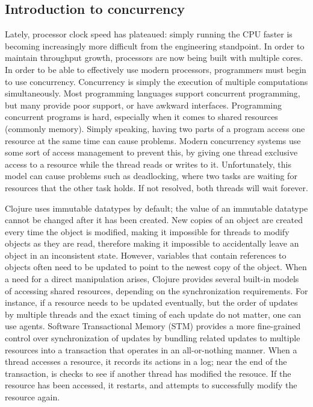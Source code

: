 \documentclass[12pt]{article}
\newcommand{\comment}[1]{{\bf \tt  {#1}}}
\newcommand{\emcomment}[1]{\textcolor{ForestGreen}{\comment{Elena: {#1}}}}
\begin{document}
\subsection{Introduction to concurrency}\label{sec:concurrency}
 Lately, processor clock speed has plateaued: simply running the CPU faster is becoming increasingly more difficult from the engineering standpoint. 
In order to maintain throughput growth, processors are now being built with multiple cores. In order to be able to effectively use modern processors, programmers must begin to use concurrency. Concurrency is simply the execution of multiple computations simultaneously. Most programming languages support concurrent programming, but many provide poor support, or have awkward interfaces. 
Programming concurrent programs is hard, especially when it comes to shared resources (commonly memory). Simply speaking, having two parts of a program access one resource at the same time can cause problems. Modern concurrency systems use some sort of access management to prevent this, by giving one thread exclusive access to a resource while the thread reads or writes to it. Unfortunately, this model can cause problems such as deadlocking, where two tasks are waiting for resources that the other task holds. If not resolved, both threads will wait forever. 

Clojure uses immutable datatypes by default; the value of an immutable datatype cannot be changed after it has been created. New copies of an object are created every time the object is modified, making it impossible for threads to modify objects as they are read, therefore making it impossible to accidentally leave an object in an inconsistent state. 
However, variables that contain references to objects often need to be updated to point to the newest copy of the object. When a need for a direct manipulation arises, 
Clojure provides several built-in models of accessing shared resources, depending on the synchronization requirements. For instance, if a resource needs to be updated eventually, but the order of updates by multiple threads and the exact timing of each update do not matter, one can use agents. Software Transactional Memory (STM) provides a more fine-grained control over synchronization of updates by bundling related updates to multiple resources into a transaction that operates in an all-or-nothing manner. When a thread accesses a resource, it records its actions in a log; near the end of the transaction, is checks to see if another thread has modified the resouce. If the resource has been accessed, it restarts, and attempts to successfully modify the resource again.
\end{document}
